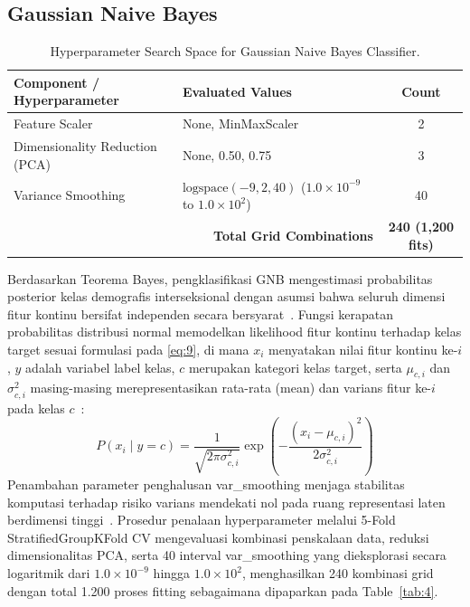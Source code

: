\subsection{Gaussian Naive Bayes}
\label{sec:gaussian_naive_bayes}

\begin{table}[htbp]
\caption{Hyperparameter Search Space for Gaussian Naive Bayes Classifier.}
\label{tab:4}
\label{tab:IV}
\label{tab:gnb_params}
\centering
\footnotesize
\begin{tabular}{llc}
\toprule
Component / Hyperparameter & Evaluated Values & Count \\
\midrule
Feature Scaler & None, MinMaxScaler & 2 \\
Dimensionality Reduction (PCA) & None, 0.50, 0.75 & 3 \\
Variance Smoothing & $\text{logspace}(-9, 2, 40)$ ($1.0 \times 10^{-9}$ to $1.0 \times 10^{2}$) & 40 \\
\midrule
\multicolumn{2}{r}{\textbf{Total Grid Combinations}} & \textbf{240 (1,200 fits)} \\
\bottomrule
\end{tabular}
\end{table}

Berdasarkan Teorema Bayes, pengklasifikasi GNB mengestimasi probabilitas posterior kelas demografis interseksional dengan asumsi bahwa seluruh dimensi fitur kontinu bersifat independen secara bersyarat~\cite{ref35}. Fungsi kerapatan probabilitas distribusi normal memodelkan likelihood fitur kontinu terhadap kelas target sesuai formulasi pada \eqref{eq:9}, di mana $x_i$ menyatakan nilai fitur kontinu ke-$i$, $y$ adalah variabel label kelas, $c$ merupakan kategori kelas target, serta $\mu_{c,i}$ dan $\sigma_{c,i}^2$ masing-masing merepresentasikan rata-rata (mean) dan varians fitur ke-$i$ pada kelas $c$~\cite{ref35}:
\begin{equation}
P(x_i \mid y = c) = \frac{1}{\sqrt{2\pi\sigma_{c,i}^2}} \exp\left(-\frac{(x_i - \mu_{c,i})^2}{2\sigma_{c,i}^2}\right)
\label{eq:9}
\end{equation}
Penambahan parameter penghalusan var\_smoothing menjaga stabilitas komputasi terhadap risiko varians mendekati nol pada ruang representasi laten berdimensi tinggi~\cite{ref36}. Prosedur penalaan hyperparameter melalui 5-Fold StratifiedGroupKFold CV mengevaluasi kombinasi penskalaan data, reduksi dimensionalitas PCA, serta 40 interval var\_smoothing yang dieksplorasi secara logaritmik dari $1.0 \times 10^{-9}$ hingga $1.0 \times 10^{2}$, menghasilkan 240 kombinasi grid dengan total 1.200 proses fitting sebagaimana dipaparkan pada Table~\ref{tab:4}.
